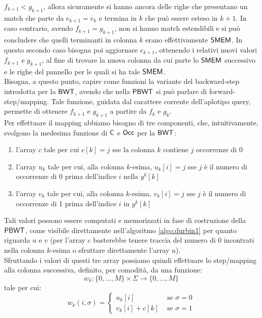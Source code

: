 $f_{k+1}<g_{k+1}$, allora sicuramente si hanno ancora delle righe che presentano un
match che parte da $e_{k+1}=e_{k}$ e termina in $k$ che può essere esteso in
$k+1$. In caso contrario, avendo $f_{k+1}=g_{k+1}$, non si hanno match
estendibili e si può concludere che quelli terminanti in colonna $k$
erano effettivamente $\mbox{\rm {\sf SMEM}}$. In questo secondo caso bisogna poi aggiornare
$e_{k+1}$, 
ottenendo i relativi nuovi valori $f_{k+1}$ e $g_{k+1}$, al fine di trovare la
nuova 
colonna da cui parte lo $\mbox{\rm {\sf SMEM}}$ successivo e le righe del pannello per le quali
si ha tale $\mbox{\rm {\sf SMEM}}$. \\
Bisogna, a questo punto, capire come funzioni la
variante del backward-step introdotta per la $\mbox{\rm {\sf BWT}}$, avendo che nella $\mbox{\rm {\sf PBWT}}$ si
può parlare di forward-step/mapping. Tale funzione,
guidata dal carattere corrente dell'aplotipo query, permette di ottenere
$f_{k+1}$ e $g_{k+1}$ a partire da $f_k$ e $g_k$.\\ 
Per effettuare il mapping abbiamo bisogno di tre componenti, che,
intuitivamente, svolgono la medesima funzione di $\mbox{\rm {\sf C}}$ e $\mbox{\rm {\sf Occ}}$ per la
$\mbox{\rm {\sf BWT}}$: 
\begin{enumerate}
  \item l'array $c$ tale per cui $c[k]=j$ sse la colonna $k$ contiene $j$
  occorrenze di 0
  \item l'array $u_k$ tale per cui, alla colonna $k$-esima, $u_k[i]=j$ sse $j$ è
  il numero di occorrenze di 0 prima dell'indice $i$ nella $y^k[k]$ 
  \item l'array $v_k$ tale per cui, alla colonna $k$-esima, $v_k[i]=j$ sse $j$ è
  il numero di occorrenze di 1 prima dell'indice $i$ in $y^k[k]$ 
\end{enumerate}
Tali valori possono essere computati e memorizzati in fase di costruzione della
$\mbox{\rm {\sf PBWT}}$, come visibile direttamente nell'algoritmo \ref{algo:durbin1} per
quanto riguarda $u$ e $v$ (per l'array $c$ basterebbe tenere traccia del numero
di 0 incontrati nella colonna $k$-esima o sfruttare direttamente l'array $u$).\\
Sfruttando i valori di questi tre array possiamo quindi effettuare lo
step/mapping alla colonna successiva,
definito, per comodità, da una funzione:
\begin{equation}
  \label{eq:pbwtw1}
  w_k:\{0,\ldots,M\}\times\Sigma\to \{0,\ldots,M\}
\end{equation}
tale per cui:
\begin{equation}
  \label{eq:pbwtw2}
  w_k(i,\sigma)=
  \begin{cases}
    u_k[i]&\mbox{ se }\sigma=0\\
    v_k[i]+c[k]&\mbox{ se }\sigma=1
  \end{cases}
\end{equation}

